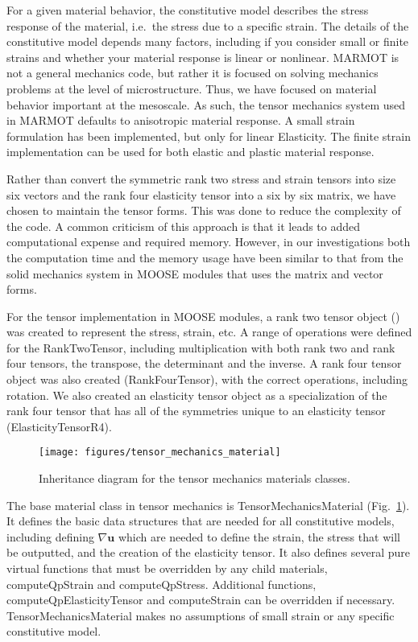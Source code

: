 \documentclass[letter,12pt,fleqn]{article}
\begin{document}
For a given material behavior, the constitutive model describes the stress response of the material, i.e.\ the stress due to a specific strain. The details of the constitutive model depends many factors, including if you consider small or finite strains and whether your material response is linear or nonlinear. MARMOT is not a general mechanics code, but rather it is focused on solving mechanics problems at the level of microstructure. Thus, we have focused on material behavior important at the mesoscale. As such, the tensor mechanics system used in MARMOT defaults to anisotropic material response. A small strain formulation has been implemented, but only for linear Elasticity. The finite strain implementation can be used for both elastic and plastic material response.

Rather than convert the symmetric rank two stress and strain tensors into size six vectors and the rank four elasticity tensor into a six by six matrix, we have chosen to maintain the tensor forms. This was done to reduce the complexity of the code. A common criticism of this approach is that it leads to added computational expense and required memory. However, in our investigations both the computation time and the memory usage have been similar to that from the solid mechanics system in MOOSE modules that uses the matrix and vector forms. 

For the tensor implementation in MOOSE modules, a rank two tensor object () was created to represent the stress, strain, etc. A range of operations were defined for the RankTwoTensor, including multiplication with both rank two and rank four tensors, the transpose, the determinant and the inverse. A rank four tensor object was also created (RankFourTensor), with the correct operations, including rotation. We also created an elasticity tensor object as a specialization of the rank four tensor that has all of the symmetries unique to an elasticity tensor (ElasticityTensorR4).

\begin{figure}[t]
  \centering
  \texttt{[image: figures/tensor\_mechanics\_material]}
  \caption{Inheritance diagram for the tensor mechanics materials classes.}\label{fig:tensor_mech}
\end{figure}
The base material class in tensor mechanics is TensorMechanicsMaterial (Fig.~\ref{fig:tensor_mech}). It defines the basic data structures that are needed for all constitutive models, including defining $\nabla \mathbf{u}$ which are needed to define the strain, the stress that will be outputted, and the creation of the elasticity tensor. It also defines several pure virtual functions that must be overridden by any child materials, computeQpStrain and computeQpStress. Additional functions, computeQpElasticityTensor and computeStrain can be overridden if necessary. TensorMechanicsMaterial makes no assumptions of small strain or any specific constitutive model.
\end{document}
